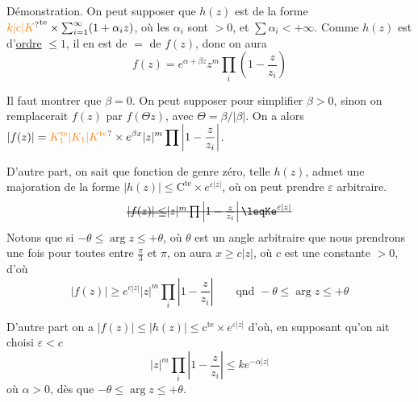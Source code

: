
Démonstration. On peut supposer
que $h(z)$ est de la forme $\unsure{k|\mathrm c|K}^{\mathrm{te}}\times\sum_{i=1}^{\infty}(1+\alpha_i z)$, où
les $\alpha_i$ sont $>0$, et $\sum\alpha_i<+\infty$. Comme
$h(z)$ est d'\uline{ordre} $\leq1$, il en est de $=$ de
$f(z)$, donc on aura
\[ f(z)=e^{\alpha+\beta z}z^m\prod_i\left(1-\frac{z}{z_i}\right) \]

Il faut montrer que $\beta=0$. On peut supposer
pour simplifier $\beta>0$, sinon on remplacerait
$f(z)$ par $f(\Theta z)$, avec $\Theta=\beta/|\beta|$. On
a alors $\displaystyle |f(z)|=\unsure{K_1^{\mathrm{te}}|K_1|K^{\mathrm{te}}}\times e^{\beta x}|z|^m\prod\left|1-\frac{z}{z_i}\right|$.

D'autre part, on sait que   fonction
de genre zéro, telle $h(z)$, admet une
majoration de la forme $|h(z)|\leq\mathrm C^{\mathrm{te}}\times e^{\varepsilon|z|}$, où
on peut prendre $\varepsilon$ arbitraire. 
\[ \deleted{\deleted{|f(z)|\leq}|z|^m\prod\left|1-\frac{z}{z_i}\right|\leqKe^{\varepsilon|z|}} \]
Notons que si $-\theta\leq\arg z\leq+\theta$, où $\theta$ est
un angle arbitraire que nous prendrons une
fois pour toutes entre $\frac{\pi}{3}$ et $\pi$, on
aura $x\geq c|z|$, où $c$ est une
constante $>0$, d'où 
\[ |f(z)|\geq e^{c|z|}|z|^m\prod_i\left|1-\frac z{z_i}\right|\qquad\text{qnd }-\theta\leq\arg z\leq+\theta \]

D'autre part on a $|f(z)|\leq|h(z)|\leq \mathrm c^{\mathrm{te}}\times e^{\varepsilon|z|}$
d'où, en supposant qu'on ait choisi $\varepsilon<c$
\[ |z|^m\prod_i\left|1-\frac{z}{z_i}\right|\leq k e^{-\alpha|z|} \]
où $\alpha>0$, dès que $-\theta\leq\arg z\leq+\theta$.

